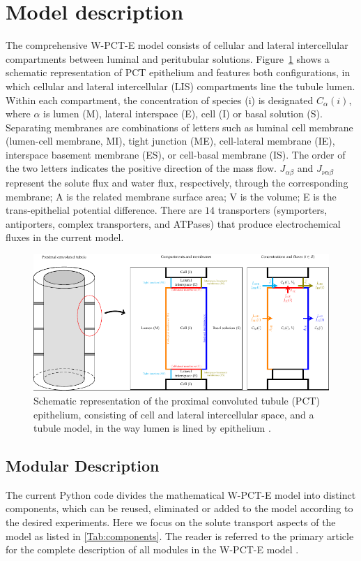 \documentclass[fleqn,10pt]{physiome}
\begin{document}
\section{Model description}
The comprehensive W-PCT-E model consists of cellular and lateral intercellular compartments between luminal and peritubular solutions. Figure~\ref{fig:Schematic_PCT} shows a schematic representation of PCT epithelium and features both configurations, in which cellular and lateral intercellular (LIS) compartments line the tubule lumen. Within each compartment, the concentration of species (i) is designated $C_{\alpha}(i)$, where ${\alpha}$ is lumen (M), lateral interspace (E), cell (I) or basal solution (S). Separating membranes are combinations of letters such as luminal cell membrane (lumen-cell membrane, MI), tight junction (ME), cell-lateral membrane (IE), interspace basement membrane (ES), or cell-basal membrane (IS). The order of the two letters indicates the positive direction of the mass flow. $J_{\alpha \beta}$ and $J_{\nu \alpha \beta}$ represent the solute flux and water flux, respectively, through the corresponding membrane; A is the related membrane surface area; V is the volume; E is the trans-epithelial potential difference. 
There are $14$ transporters (symporters, antiporters, complex transporters, and ATPases) that produce electrochemical fluxes in the current model.
\begin{figure}
    \centering
    \includegraphics[width=12cm]{Figure2.pdf}
    \caption{Schematic representation of the proximal convoluted tubule (PCT) epithelium, consisting of cell and lateral intercellular space, and a tubule model, in the way lumen is lined by epithelium \cite[Figure 2]{noroozbabaee2022modular}. }
    \label{fig:Schematic_PCT}
\end{figure}

\subsection{Modular Description}
The current Python code divides the mathematical W-PCT-E model into distinct components, which can be reused, eliminated or added to the model according to the desired experiments. Here we focus on the solute transport aspects of the model as listed in \autoref{Tab:components}. The reader is referred to the primary article for the complete description of all modules in the W-PCT-E model \citep{noroozbabaee2022modular}.
\end{document}
